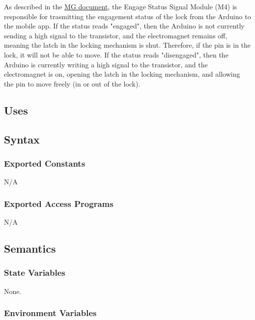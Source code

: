 \documentclass[12pt, titlepage]{article}
\begin{document}
As described in the \href{https://github.com/NevoAbigail/Capstone/blob/main/docs/Design/SoftArchitecture/MG.pdf}{MG document}, the Engage Status Signal Module (M4) is responsible for trasmitting the engagement status of the lock from the Arduino to the mobile app. If the status reads "engaged", then the Arduino is not currently sending a high signal to the transistor, and the electromagnet remains off, meaning the latch in the locking mechanism is shut. Therefore, if the pin is in the lock, it will not be able to move. If the status reads "disengaged", then the Arduino is currently writing a high signal to the transistor, and the electromagnet is on, opening the latch in the locking mechanism, and allowing the pin to move freely (in or out of the lock). 

\subsection{Uses}


\subsection{Syntax}

\subsubsection{Exported Constants}

N/A

\subsubsection{Exported Access Programs}

N/A

\subsection{Semantics}

\subsubsection{State Variables}

None. 

\subsubsection{Environment Variables}

\end{document}
